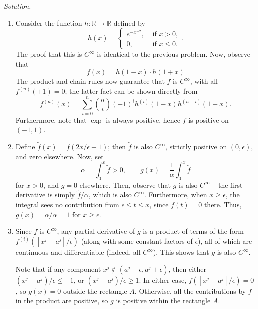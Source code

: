 \documentclass[11pt]{report}
\newcommand{\R}{\mathbb{R}}
\newcommand{\solution}{\noindent\textit{Solution.} }
\begin{document}
    \solution \begin{enumerate}
        \item Consider the function $h\colon \R \to \R$ defined by \[
            h(x) = \begin{cases}
                e^{-x^{-2}}, &\text{ if }x > 0, \\
                0, &\text{ if }x \leq 0.
            \end{cases}.
        \] The proof that this is $C^\infty$ is identical to the previous problem.
        Now, observe that \[
            f(x) = h(1 - x)\cdot h(1 + x)
        \] The product and chain rules now guarantee that $f$ is $C^\infty$, with all
        $f^{(n)}(\pm 1) = 0$; the latter fact can be shown directly from \[
            f^{(n)}(x) = \sum_{i = 0}^n \binom{n}{i} (-1)^i h^{(i)}(1 - x) h^{(n -
            i)}(1 + x).
        \] Furthermore, note that $\exp$ is always positive, hence $f$ is positive on
        $(-1, 1)$.


        \item Define $\tilde{f}(x) = f(2x / \epsilon - 1)$; then $\tilde{f}$ is also
        $C^\infty$, strictly positive on $(0, \epsilon)$, and zero elsewhere. Now,
        set \[
            \alpha = \int_0^\epsilon \tilde{f} > 0, \qquad
            g(x) = \frac{1}{\alpha}\int_0^x \tilde{f}
        \] for $x > 0$, and $g = 0$ elsewhere. Then, observe that $g$ is also
        $C^\infty$ -- the first derivative is simply $\tilde{f} / \alpha$, which is
        also $C^\infty$. Furthermore, when $x \geq \epsilon$, the integral sees no
        contribution from $\epsilon \leq t \leq x$, since $f(t) = 0$ there. Thus,
        $g(x) = \alpha / \alpha = 1$ for $x \geq \epsilon$.


        \item Since $f$ is $C^\infty$, any partial derivative of $g$ is a product of
        terms of the form $f^{(i)}([x^j - a^j] / \epsilon)$ (along with some constant
        factors of $\epsilon$), all of which are continuous and differentiable
        (indeed, all $C^\infty$). This shows that $g$ is also $C^\infty$.

        Note that if any component $x^j \notin (a^j - \epsilon, a^j + \epsilon)$,
        then either $(x^j - a^j) / \epsilon \leq -1$, or $(x^j - a^j) / \epsilon \geq
        1$. In either case, $f([x^j - a^j] / \epsilon) = 0$, so $g(x) = 0$ outside
        the rectangle $A$. Otherwise, all the contributions by $f$ in the product are
        positive, so $g$ is positive within the rectangle $A$.



\end{enumerate}
\end{document}
